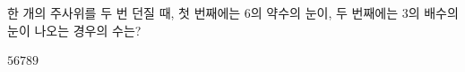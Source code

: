 한 개의 주사위를 두 번 던질 때, 첫 번째에는 6의 약수의 눈이, 두 번째에는 3의 배수의 눈이 나오는 경우의 수는?
\begin{choices32}{$5$}{$6$}{$7$}{$8$}{$9$}\end{choices32}
